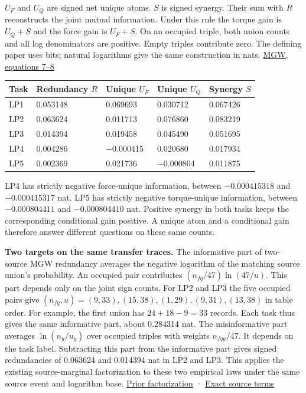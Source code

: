\(U_F\) and \(U_Q\) are signed net unique atoms. \(S\) is signed synergy. Their sum with \(R\) reconstructs the joint mutual information. Under this rule the torque gain is \(U_Q+S\) and the force gain is \(U_F+S\). On an occupied triple, both union counts and all log denominators are positive. Empty triples contribute zero. The defining paper uses bits; natural logarithms give the same construction in nats. \href{https://arxiv.org/abs/2002.03356v5}{MGW, equations 7--8}

{\def\LTcaptype{none} %
\begin{longtable}[]{@{}lllll@{}}
\toprule\noalign{}
Task & Redundancy \(R\) & Unique \(U_F\) & Unique \(U_Q\) & Synergy \(S\) \\
\midrule\noalign{}
\endhead
\bottomrule\noalign{}
\endlastfoot
LP1 & 0.053148 & 0.069693 & 0.030712 & 0.067426 \\
LP2 & 0.063624 & 0.011713 & 0.076860 & 0.083219 \\
LP3 & 0.014394 & 0.019458 & 0.045490 & 0.051695 \\
LP4 & 0.004286 & −0.000415 & 0.020680 & 0.017934 \\
LP5 & 0.002369 & 0.021736 & −0.000804 & 0.011875 \\
\end{longtable}
}

LP4 has strictly negative force-unique information, between \(-0.000415318\) and \(-0.000415317\) nat. LP5 has strictly negative torque-unique information, between \(-0.000804411\) and \(-0.000804410\) nat. Positive synergy in both tasks keeps the corresponding conditional gain positive. A unique atom and a conditional gain therefore answer different questions on these same counts.

\textbf{Two targets on the same transfer traces.} The informative part of two-source MGW redundancy averages the negative logarithm of the matching source union's probability. An occupied pair contributes \((n_{fq}/47)\ln(47/u)\). This part depends only on the joint sign counts. For LP2 and LP3 the five occupied pairs give \((n_{fq},u)=(9,33),(15,38),(1,29),(9,31),(13,38)\) in table order. For example, the first union has \(24+18-9=33\) records. Each task thus gives the same informative part, about 0.284314 nat. The misinformative part averages \(\ln(n_y/u_y)\) over occupied triples with weights \(n_{fqy}/47\). It depends on the task label. Subtracting this part from the informative part gives signed redundancies of 0.063624 and 0.014394 nat in LP2 and LP3. This applies the existing source-marginal factorization to these two empirical laws under the same source event and logarithm base. \href{https://github.com/sepahead/pid-rs/blob/main/SXPID3_SOURCE_MARGINAL_AND_BOUNDED_AUDIT.md}{Prior factorization} · \href{https://github.com/sepahead/pid-rs/blob/main/audit/research/robot-wrist-slope-signs/trace-provenance.json}{Exact source terms}

